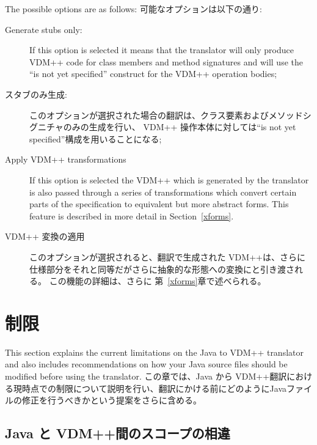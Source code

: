 \documentclass[\pformat,12pt]{jarticle}
\begin{document}
The possible options are as follows:
可能なオプションは以下の通り:
\begin{description}
\item[Generate stubs only:]
If this option is selected it means that the translator will only
produce VDM++ code for class members and method signatures and will
use the ``is not yet specified'' construct for the VDM++ operation
bodies; 
\item[スタブのみ生成:]
このオプションが選択された場合の翻訳は、クラス要素およびメソッドシグニチャのみの生成を行い、  VDM++ 操作本体に対しては``is not yet specified''構成を用いることになる; 
\item[Apply VDM++ transformations] If this option is selected the
  VDM++ which is generated by the translator is also passed through a
  series of transformations which convert certain parts of the
  specification to equivalent but more abstract forms. This feature is
  described in more detail in Section~\ref{xforms}. 
\item[VDM++ 変換の適用] このオプションが選択されると、翻訳で生成された VDM++は、さらに仕様部分をそれと同等だがさらに抽象的な形態への変換にと引き渡される。
この機能の詳細は、さらに 第~\ref{xforms}章で述べられる。
\end{description}

\section{制限}\label{limitations}

This section explains the current limitations on the Java to VDM++
translator and also includes recommendations on how your Java
source files should be modified before using the translator.
この章では、Java から VDM++翻訳における現時点での制限について説明を行い、翻訳にかける前にどのようにJavaファイルの修正を行うべきかという提案をさらに含める。

\subsection{Java と VDM++間のスコープの相違}
\end{document}

